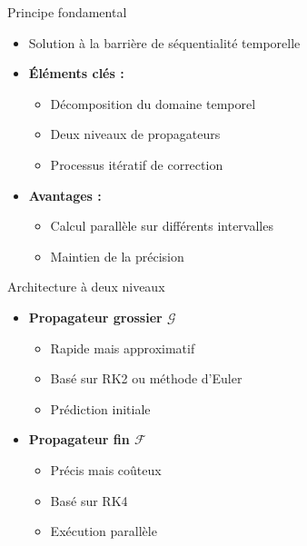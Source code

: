 
\begin{frame}{Principe fondamental}
    \begin{itemize}
        \item Solution à la barrière de séquentialité temporelle
        \item \textbf{Éléments clés :}
        \begin{itemize}
            \item Décomposition du domaine temporel
            \item Deux niveaux de propagateurs
            \item Processus itératif de correction
        \end{itemize}
        \item \textbf{Avantages :}
        \begin{itemize}
            \item Calcul parallèle sur différents intervalles
            \item Maintien de la précision
        \end{itemize}
    \end{itemize}
\end{frame}

\begin{frame}{Architecture à deux niveaux}
    \begin{itemize}
        \item \textbf{Propagateur grossier $\mathcal{G}$}
        \begin{itemize}
            \item Rapide mais approximatif
            \item Basé sur RK2 ou méthode d'Euler
            \item Prédiction initiale
        \end{itemize}
        \vspace{0.3cm}
        \item \textbf{Propagateur fin $\mathcal{F}$}
        \begin{itemize}
            \item Précis mais coûteux
            \item Basé sur RK4
            \item Exécution parallèle
        \end{itemize}
    \end{itemize}
\end{frame}

